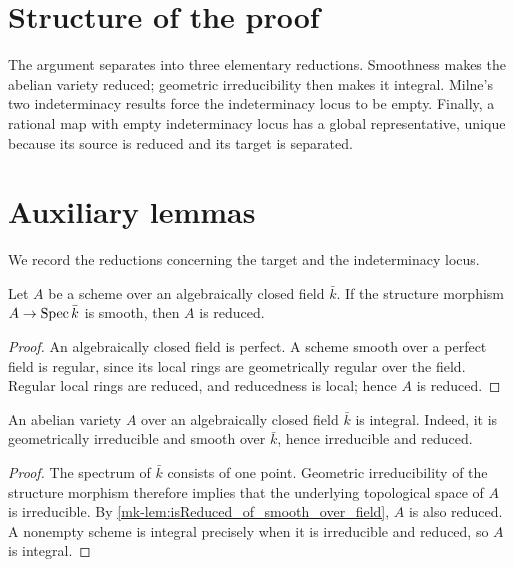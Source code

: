 \section{Structure of the proof}
The argument separates into three elementary reductions.  Smoothness makes
the abelian variety reduced; geometric irreducibility then makes it
integral.  Milne's two indeterminacy results force the indeterminacy locus to
be empty.  Finally, a rational map with empty indeterminacy locus has a
global representative, unique because its source is reduced and its target
is separated.

\section{Auxiliary lemmas}
We record the reductions concerning the target and the indeterminacy locus.

\begin{lemma}\label{mk-lem:isReduced_of_smooth_over_field}
  \leanok

  Let \(A\) be a scheme over an algebraically closed field \(\bar k\).  If
  the structure morphism \(A\to\operatorname{Spec}\bar k\) is smooth, then \(A\) is
  reduced.
\end{lemma}
\begin{proof}
  An algebraically closed field is perfect.  A scheme smooth over a
  perfect field is regular, since its local rings are geometrically
  regular over the field.  Regular local rings are reduced, and
  reducedness is local; hence \(A\) is reduced.
\end{proof}

\begin{lemma}\label{mk-lem:av_isIntegral_of_smooth_geomIrred}
  \leanok

  An abelian variety \(A\) over an algebraically closed field \(\bar k\) is
  integral.  Indeed, it is geometrically irreducible and smooth over
  \(\bar k\), hence irreducible and reduced.
\end{lemma}
\begin{proof}
  The spectrum of \(\bar k\) consists of one point.  Geometric
  irreducibility of the structure morphism therefore implies that the
  underlying topological space of \(A\) is irreducible.  By
  \ref{mk-lem:isReduced_of_smooth_over_field}, \(A\) is also reduced.  A
  nonempty scheme is integral precisely when it is irreducible and
  reduced, so \(A\) is integral.
\end{proof}

